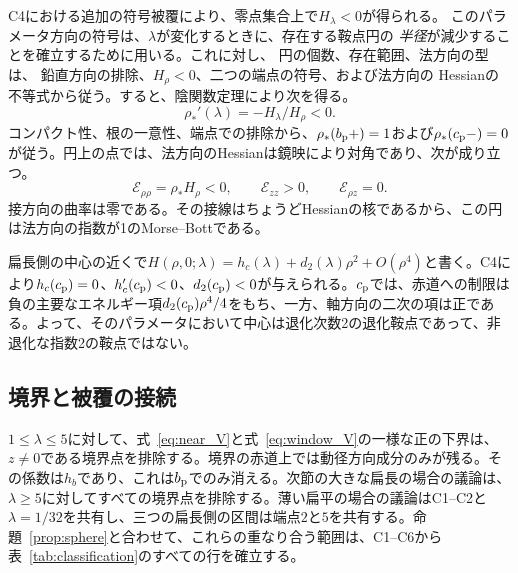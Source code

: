C4における追加の符号被覆により、零点集合上で$H_\lambda<0$が得られる。
このパラメータ方向の符号は、$\lambda$が変化するときに、存在する鞍点円の
\emph{半径}が減少することを確立するために用いる。これに対し、
円の個数、存在範囲、法方向の型は、
鉛直方向の排除、$H_\rho<0$、二つの端点の符号、および法方向の
Hessianの不等式から従う。すると、陰関数定理により次を得る。
\begin{equation}\label{eq:branch_slope}
 \rho_*'(\lambda)=-H_\lambda/H_\rho<0.
\end{equation}
コンパクト性、根の一意性、端点での排除から、$\rho_*(b_{\mathrm p}+)=1$および$\rho_*(c_{\mathrm p}-)=0$が従う。円上の点では、法方向のHessianは鏡映により対角であり、次が成り立つ。
\[
 \mathcal E_{\rho\rho}=\rho_*H_\rho<0,\qquad \mathcal E_{zz}>0,
 \qquad \mathcal E_{\rho z}=0.
\]
接方向の曲率は零である。その接線はちょうどHessianの核であるから、この円は法方向の指数が1のMorse--Bottである\citep{Bott1954}。

扁長側の中心の近くで$H(\rho,0;\lambda)=h_c(\lambda)+d_2(\lambda)\rho^2+O(\rho^4)$と書く。C4により$h_c(c_{\mathrm p})=0$、$h_c'(c_{\mathrm p})<0$、$d_2(c_{\mathrm p})<0$が与えられる。$c_{\mathrm p}$では、赤道への制限は負の主要なエネルギー項$d_2(c_{\mathrm p})\rho^4/4$をもち、一方、軸方向の二次の項は正である。よって、そのパラメータにおいて中心は退化次数2の退化鞍点であって、非退化な指数2の鞍点ではない。



\subsection{境界と被覆の接続}
$1\le\lambda\le5$に対して、式~\eqref{eq:near_V}と式~\eqref{eq:window_V}の一様な正の下界は、$z\ne0$である境界点を排除する。境界の赤道上では動径方向成分のみが残る。その係数は$h_b$であり、これは$b_{\mathrm p}$でのみ消える。次節の大きな扁長の場合の議論は、$\lambda\ge5$に対してすべての境界点を排除する。薄い扁平の場合の議論はC1--C2と$\lambda=1/32$を共有し、三つの扁長側の区間は端点$2$と$5$を共有する。命題~\ref{prop:sphere}と合わせて、これらの重なり合う範囲は、C1--C6から表~\ref{tab:classification}のすべての行を確立する。

